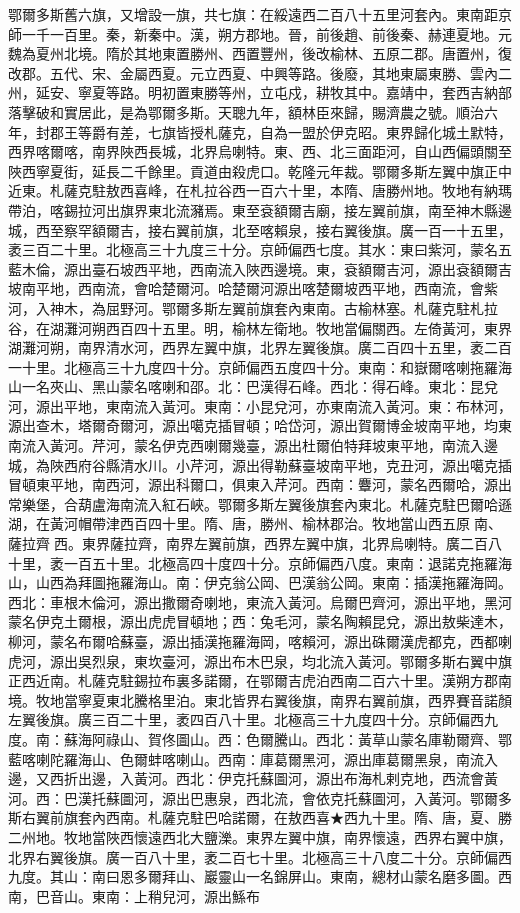 \begin{pinyinscope}
鄂爾多斯舊六旗，又增設一旗，共七旗：在綏遠西二百八十五里河套內。東南距京師一千一百里。秦，新秦中。漢，朔方郡地。晉，前後趙、前後秦、赫連夏地。元魏為夏州北境。隋於其地東置勝州、西置豐州，後改榆林、五原二郡。唐置州，復改郡。五代、宋、金屬西夏。元立西夏、中興等路。後廢，其地東屬東勝、雲內二州，延安、寧夏等路。明初置東勝等州，立屯戍，耕牧其中。嘉靖中，套西吉納部落擊破和實居此，是為鄂爾多斯。天聰九年，額林臣來歸，賜濟農之號。順治六年，封郡王等爵有差，七旗皆授札薩克，自為一盟於伊克昭。東界歸化城土默特，西界喀爾喀，南界陜西長城，北界烏喇特。東、西、北三面距河，自山西偏頭關至陜西寧夏街，延長二千餘里。貢道由殺虎口。乾隆元年裁。鄂爾多斯左翼中旗正中近東。札薩克駐敖西喜峰，在札拉谷西一百六十里，本隋、唐勝州地。牧地有納瑪帶泊，喀錫拉河出旗界東北流瀦焉。東至袞額爾吉廟，接左翼前旗，南至神木縣邊城，西至察罕額爾吉，接右翼前旗，北至喀賴泉，接右翼後旗。廣一百一十五里，袤三百二十里。北極高三十九度三十分。京師偏西七度。其水：東曰紫河，蒙名五藍木倫，源出臺石坡西平地，西南流入陜西邊境。東，袞額爾吉河，源出袞額爾吉坡南平地，西南流，會哈楚爾河。哈楚爾河源出喀楚爾坡西平地，西南流，會紫河，入神木，為屈野河。鄂爾多斯左翼前旗套內東南。古榆林塞。札薩克駐札拉谷，在湖灘河朔西百四十五里。明，榆林左衛地。牧地當偏關西。左倚黃河，東界湖灘河朔，南界清水河，西界左翼中旗，北界左翼後旗。廣二百四十五里，袤二百一十里。北極高三十九度四十分。京師偏西五度四十分。東南：和嶽爾喀喇拖羅海山一名夾山、黑山蒙名喀喇和邵。北：巴漢得石峰。西北：得石峰。東北：昆兌河，源出平地，東南流入黃河。東南：小昆兌河，亦東南流入黃河。東：布林河，源出查木，塔爾奇爾河，源出噶克插冒頓；哈岱河，源出賀爾博金坡南平地，均東南流入黃河。芹河，蒙名伊克西喇爾幾臺，源出杜爾伯特拜坡東平地，南流入邊城，為陜西府谷縣清水川。小芹河，源出得勒蘇臺坡南平地，克丑河，源出噶克插冒頓東平地，南西河，源出科爾口，俱東入芹河。西南：麞河，蒙名西爾哈，源出常樂堡，合葫盧海南流入紅石峽。鄂爾多斯左翼後旗套內東北。札薩克駐巴爾哈遜湖，在黃河帽帶津西百四十里。隋、唐，勝州、榆林郡治。牧地當山西五原南、薩拉齊西。東界薩拉齊，南界左翼前旗，西界左翼中旗，北界烏喇特。廣二百八十里，袤一百五十里。北極高四十度四十分。京師偏西八度。東南：退諾克拖羅海山，山西為拜圖拖羅海山。南：伊克翁公岡、巴漢翁公岡。東南：插漢拖羅海岡。西北：車根木倫河，源出撒爾奇喇地，東流入黃河。烏爾巴齊河，源出平地，黑河蒙名伊克土爾根，源出虎虎冒頓地；西：兔毛河，蒙名陶賴昆兌，源出敖柴達木，柳河，蒙名布爾哈蘇臺，源出插漢拖羅海岡，喀賴河，源出硃爾漢虎都克，西都喇虎河，源出吳烈泉，東坎臺河，源出布木巴泉，均北流入黃河。鄂爾多斯右翼中旗正西近南。札薩克駐錫拉布裏多諾爾，在鄂爾吉虎泊西南二百六十里。漢朔方郡南境。牧地當寧夏東北騰格里泊。東北皆界右翼後旗，南界右翼前旗，西界賽音諾顏左翼後旗。廣三百二十里，袤四百八十里。北極高三十九度四十分。京師偏西九度。南：蘇海阿祿山、賀佟圖山。西：色爾騰山。西北：黃草山蒙名庫勒爾齊、鄂藍喀喇陀羅海山、色爾蚌喀喇山。西南：庫葛爾黑河，源出庫葛爾黑泉，南流入邊，又西折出邊，入黃河。西北：伊克托蘇圖河，源出布海札剌克地，西流會黃河。西：巴漢托蘇圖河，源出巴惠泉，西北流，會依克托蘇圖河，入黃河。鄂爾多斯右翼前旗套內西南。札薩克駐巴哈諾爾，在敖西喜★西九十里。隋、唐，夏、勝二州地。牧地當陜西懷遠西北大鹽濼。東界左翼中旗，南界懷遠，西界右翼中旗，北界右翼後旗。廣一百八十里，袤二百七十里。北極高三十八度二十分。京師偏西九度。其山：南曰恩多爾拜山、巖靈山一名錦屏山。東南，總材山蒙名磨多圖。西南，巴音山。東南：上稍兒河，源出鯀布
\end{pinyinscope}
